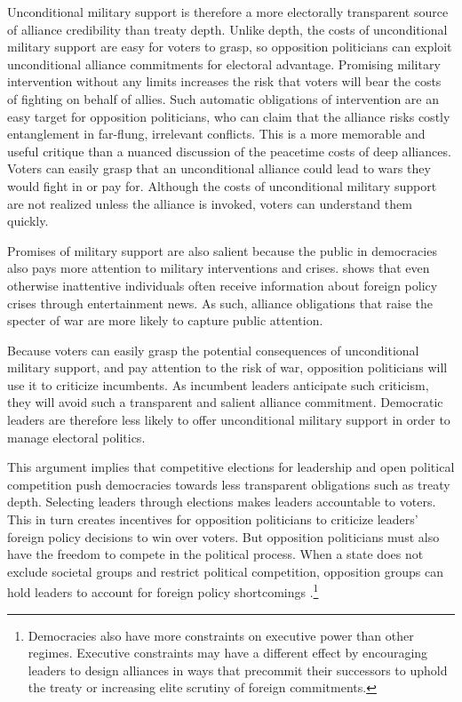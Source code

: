 \documentclass[12pt]{article}
\begin{document}
Unconditional military support is therefore a more electorally transparent source of alliance credibility than treaty depth. 
Unlike depth, the costs of unconditional military support are easy for voters to grasp, so opposition politicians can exploit unconditional alliance commitments for electoral advantage. 
Promising military intervention without any limits increases the risk that voters will bear the costs of fighting on behalf of allies. 
Such automatic obligations of intervention are an easy target for opposition politicians, who can claim that the alliance risks costly entanglement in far-flung, irrelevant conflicts.  
This is a more memorable and useful critique than a nuanced discussion of the peacetime costs of deep alliances. 
Voters can easily grasp that an unconditional alliance could lead to wars they would fight in or pay for. 
Although the costs of unconditional military support are not realized unless the alliance is invoked, voters can understand them quickly. 


Promises of military support are also salient because the public in democracies also pays more attention to military interventions and crises. 
\citet{Baum2002} shows that even otherwise inattentive individuals often receive information about foreign policy crises through entertainment news. 
As such, alliance obligations that raise the specter of war are more likely to capture public attention. 


Because voters can easily grasp the potential consequences of unconditional military support, and pay attention to the risk of war, opposition politicians will use it to criticize incumbents. 
As incumbent leaders anticipate such criticism, they will avoid such a transparent and salient alliance commitment.
Democratic leaders are therefore less likely to offer unconditional military support in order to manage electoral politics. 


This argument implies that competitive elections for leadership and open political competition push democracies towards less transparent obligations such as treaty depth.
Selecting leaders through elections makes leaders accountable to voters. 
This in turn creates incentives for opposition politicians to criticize leaders' foreign policy decisions to win over voters. 
But opposition politicians must also have the freedom to compete in the political process.
When a state does not exclude societal groups and restrict political competition, opposition groups can hold leaders to account for foreign policy shortcomings \citep{PotterBaum2014}.\footnote{Democracies also have more constraints on executive power than other regimes. Executive constraints may have a different effect by encouraging leaders to design alliances in ways that precommit their successors to uphold the treaty or increasing elite scrutiny of foreign commitments.}
\end{document}
